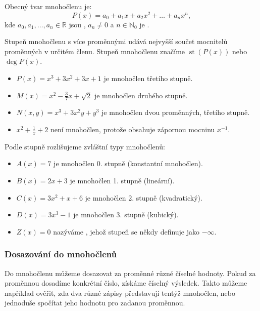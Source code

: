\documentclass[12pt,a4paper]{article}
\begin{document}
\begin{definitionbox}
    Obecný tvar mnohočlenu je:
    \[
    P(x) = a_0 + a_1x + a_2x^2 + \dots + a_nx^n,
    \]
    kde $a_0, a_1, \dots, a_n \in \mathbb{R}$ jsou , $a_n \neq 0$ a $n \in \mathbb{N}_0$ je .  
\end{definitionbox}

\newpage
Stupeň mnohočlenu s více proměnnými udává nejvyšší součet mocnitelů proměnných v určitém členu. 
Stupeň mnohočlenu značíme $\operatorname{st}(P(x))$ nebo $\deg P(x)$. 

\begin{examplebox}
\begin{itemize}
    \item $P(x) = x^3 + 3x^2 + 3x + 1$ je mnohočlen třetího stupně.
    \item $M(x) = x^2 - \tfrac{3}{7}x + \sqrt{2}$ je mnohočlen druhého stupně.
    \item $N(x,y) = x^3 + 3x^2y + y^3$ je mnohočlen dvou proměnných, třetího stupně.
    \item $x^2 + \tfrac{1}{x} + 2$ není mnohočlen, protože obsahuje zápornou mocninu $x^{-1}$.
\end{itemize}
\end{examplebox}


Podle stupně rozlišujeme zvláštní typy mnohočlenů:
\begin{examplebox}
\begin{itemize}
    \item $A(x) = 7$ je mnohočlen 0. stupně (konstantní mnohočlen).  
    \item $B(x) = 2x + 3$ je mnohočlen 1. stupně (lineární).  
    \item $C(x) = 3x^2 + x + 6$ je mnohočlen 2. stupně (kvadratický).  
    \item $D(x) = 3x^3 - 1$ je mnohočlen 3. stupně (kubický).  
    \item $Z(x) = 0$ nazýváme , jehož stupeň se někdy definuje jako $-\infty$.  
\end{itemize}
\end{examplebox}


\subsubsection*{Dosazování do mnohočlenů}

Do mnohočlenu můžeme dosazovat za proměnné různé číselné hodnoty.  
Pokud za proměnnou dosadíme konkrétní číslo, získáme číselný výsledek.  
Takto můžeme například ověřit, zda dva různé zápisy představují tentýž mnohočlen,  
nebo jednoduše spočítat jeho hodnotu pro zadanou proměnnou.
\end{document}
